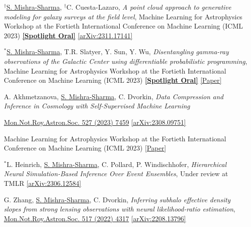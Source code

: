 \documentclass[letterpaper,11pt]{article}
\newenvironment{packed_itemize}{
\begin{itemize}[label=\raisebox{0.25ex}{\tiny$\bullet$}]
  \setlength{\itemsep}{4.2pt}
  \setlength{\parskip}{0pt}
  \setlength{\parsep}{0pt}}{\end{itemize}
}
\newenvironment{packed_enumerate}[1][]{
\begin{etaremune}[#1]
  \setlength{\itemsep}{3.7pt}
  \setlength{\parskip}{0pt}
  \setlength{\parsep}{0pt}}{\end{etaremune}
}
\begin{document}
\begin{packed_enumerate}[start=37]

  \item $^{\dagger}$\underline{S. Mishra-Sharma}, $^{\dagger}$C. Cuesta-Lazaro, \emph{A point cloud approach to generative modeling for galaxy surveys at the field level}, {Machine Learning for Astrophysics Workshop at the Fortieth International Conference on Machine Learning (ICML 2023)} \href{https://ml4astro.github.io/icml2023/}{\textbf{[Spotlight Oral]}}  \href{https://arxiv.org/abs/2311.17141}{[arXiv:2311.17141]}  %

  \item $^*$\underline{S. Mishra-Sharma}, T.R. Slatyer, Y. Sun, Y. Wu, \emph{Disentangling gamma-ray observations of the Galactic Center using differentiable probabilistic programming}, {Machine Learning for Astrophysics Workshop at the Fortieth International Conference on Machine Learning (ICML 2023)} \href{https://ml4astro.github.io/icml2023/}{\textbf{[Spotlight Oral]}} \href{https://ml4astro.github.io/icml2023/assets/52.pdf}{[Paper]}

  \item A. Akhmetzanova, \underline{S. Mishra-Sharma}, C. Dvorkin, \emph{Data Compression and Inference in Cosmology with Self-Supervised Machine Learning}
  \begin{packed_itemize}
      \item \href{https://doi.org/10.1093/mnras/stad3646}{Mon.Not.Roy.Astron.Soc. 527 (2023) 7459} \href{https://arxiv.org/abs/2308.09751}{[arXiv:2308.09751]}
      \item {Machine Learning for Astrophysics Workshop at the Fortieth International Conference on Machine Learning (ICML 2023)} \href{https://ml4astro.github.io/icml2023/assets/11.pdf}{[Paper]} 
       \end{packed_itemize}
    
  \item $^*$L. Heinrich, \underline{S. Mishra-Sharma}, C. Pollard, P. Windischhofer, \emph{Hierarchical Neural Simulation-Based Inference Over Event Ensembles}, Under review at TMLR \href{https://arxiv.org/abs/2306.12584}{[arXiv:2306.12584]}
  
  \item G. Zhang, \underline{S. Mishra-Sharma}, C. Dvorkin, \emph{Inferring subhalo effective density slopes from strong lensing observations with neural likelihood-ratio estimation}, \href{https://doi.org/10.1093/mnras/stac3014}{Mon.Not.Roy.Astron.Soc. 517 (2022) 4317} \href{https://arxiv.org/abs/2208.13796}{[arXiv:2208.13796]}


\end{packed_enumerate}
\end{document}
